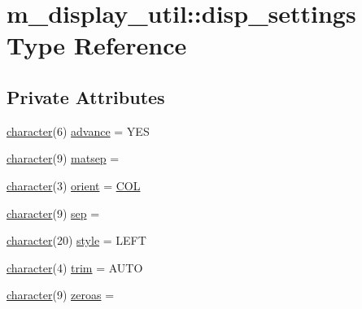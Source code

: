 \hypertarget{structm__display__util_1_1disp__settings}{}\section{m\+\_\+display\+\_\+util\+:\+:disp\+\_\+settings Type Reference}
\label{structm__display__util_1_1disp__settings}
\subsection*{Private Attributes}
\begin{DoxyCompactItemize}
\item 
\hyperlink{option__stopwatch_83_8txt_abd4b21fbbd175834027b5224bfe97e66}{character}(6) \hyperlink{structm__display__util_1_1disp__settings_ac77c8a03ca8b219fba2729f1cdb696f1}{advance} = \textquotesingle{}Y\+ES\textquotesingle{}
\item 
\hyperlink{option__stopwatch_83_8txt_abd4b21fbbd175834027b5224bfe97e66}{character}(9) \hyperlink{structm__display__util_1_1disp__settings_af118c60ba05b65a9e36adb70b8cc9113}{matsep} = \textquotesingle{} \textquotesingle{}
\item 
\hyperlink{option__stopwatch_83_8txt_abd4b21fbbd175834027b5224bfe97e66}{character}(3) \hyperlink{structm__display__util_1_1disp__settings_a0fa7ec72928f1bdc958c8bb34115f46f}{orient} = \textquotesingle{}\hyperlink{intro__blas1_83_8txt_a0e42b36b2ac00a83196c16c681590cc6}{C\+OL}\textquotesingle{}
\item 
\hyperlink{option__stopwatch_83_8txt_abd4b21fbbd175834027b5224bfe97e66}{character}(9) \hyperlink{structm__display__util_1_1disp__settings_a4c3afb0a39c7bef7a2133bcb225441b1}{sep} = \textquotesingle{} \textquotesingle{}
\item 
\hyperlink{option__stopwatch_83_8txt_abd4b21fbbd175834027b5224bfe97e66}{character}(20) \hyperlink{structm__display__util_1_1disp__settings_a2fdd709ad863c7feb95dd6335b9c0b5b}{style} = \textquotesingle{}L\+E\+FT\textquotesingle{}
\item 
\hyperlink{option__stopwatch_83_8txt_abd4b21fbbd175834027b5224bfe97e66}{character}(4) \hyperlink{structm__display__util_1_1disp__settings_ac3cddf0fdf8876a82fbb8ccf8350b535}{trim} = \textquotesingle{}A\+U\+TO\textquotesingle{}
\item 
\hyperlink{option__stopwatch_83_8txt_abd4b21fbbd175834027b5224bfe97e66}{character}(9) \hyperlink{structm__display__util_1_1disp__settings_aaa58e0709e4c91aefef6739c7a500079}{zeroas} = \textquotesingle{}\textquotesingle{}

\end{DoxyCompactItemize}
